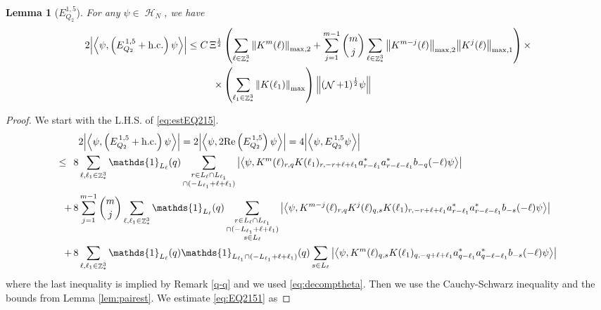 \documentclass[sn-mathphys, Numbered ,a4paper]{sn-jnl}%
\DeclareMathOperator{\Z}{\mathbb{Z}}
\DeclareMathOperator{\HH}{\mathcal{H}}
\DeclareMathOperator{\NN}{\mathcal{N}}
\newcommand{\half}{\frac{1}{2}}
\newcommand{\eva}[1]{\left\langle #1 \right\rangle}
\theoremstyle{plain}
\newtheorem{lemma}[theorem]{Lemma}
\theoremstyle{definition}
\theoremstyle{remark}
\theoremstyle{plain}
\theoremstyle{definition}
\theoremstyle{remark}
\begin{document}
\begin{lemma}[$E_{Q_2}^{1,5}$]
    For any $\psi \in \HH_N$, we have
    \begin{align}
    	2\abs{\eva{\psi,\left(E^{\,1,5}_{Q_2}+\mathrm{h.c.}\right) \psi }}
    	\leq  C\, \Xi^\half &\left(\sum\limits_{\ell \in \Z^3_*} \norm{K^m(\ell)}_{\mathrm{max,2}} +\sum\limits_{j=1}^{m-1} {{m}\choose j} \sum\limits_{\ell \in \Z^3_*} \norm{K^{m-j}(\ell)}_{\mathrm{max,2}}  \norm{ K^{j}(\ell)}_{\mathrm{max},1} \right)\nonumber \times\\ \times&\left( \sum\limits_{\ell_1\in \Z^3_*} \norm{ K(\ell_1)}_{\mathrm{max}} \right) \norm{(\NN+1)^\half \psi}  \label{eq:estEQ215}
    \end{align}
\end{lemma}
\begin{proof}
We start with the L.H.S. of \eqref{eq:estEQ215}.
\begin{align}
    &2\abs{\eva{\psi,\left(E^{\,1,5}_{Q_2}+\mathrm{h.c.}\right) \psi }} = 2\abs{\eva{\psi,2\mathrm{Re}\left(E^{\,1,5}_{Q_2}\right) \psi }} = 4\abs{\eva{\psi, E^{\,1,5}_{Q_2} \psi }}\nonumber\\
    \leq\,\;8& \sum\limits_{\ell, \ell_1\in \Z^3_*} \mathds{1}_{L_{\ell}}(q) \sum\limits_{\substack{r\in L_{\ell} \cap L_{\ell_1} \\ \cap (-L_{\ell_1}+\ell+\ell_1)}} \abs{\eva{\psi,  K^m(\ell)_{r,q} K(\ell_1)_{r,-r+\ell+\ell_1}  a^*_{r-\ell_1}a^*_{r-\ell-\ell_1}b_{-q}(-\ell)\psi }} \label{eq:EQ2151}\\
    +\,8& \sum\limits_{j=1}^{m-1} {{m}\choose j} \sum\limits_{\ell, \ell_1\in \Z^3_*}\mathds{1}_{L_{\ell}}(q) \sum\limits_{\substack{r\in L_{\ell} \cap L_{\ell_1}\\ \cap (-L_{\ell_1}+\ell+\ell_1)\\ s \in L_{\ell}}}  \abs{\eva{\psi, K^{m-j}(\ell)_{r,q} K^j(\ell)_{q,s} K(\ell_1)_{r,-r+\ell+\ell_1}  a^*_{r-\ell_1}a^*_{r-\ell-\ell_1}b_{-s}(-\ell) \psi }} \label{eq:EQ2152}\\
    +\,8&\sum\limits_{\ell, \ell_1\in \Z^3_*} \mathds{1}_{L_{\ell}}(q) \mathds{1}_{L_{\ell_1}\cap (-L_{\ell_1}+\ell+\ell_1)}(q) \sum\limits_{ s \in L_{\ell}} \abs{\eva{\psi, K^m(\ell)_{q,s} K(\ell_1)_{q,-q+\ell+\ell_1}  a^*_{q-\ell_1} a^*_{q-\ell-\ell_1} b_{-s}(-\ell) \psi }} \label{eq:EQ2153}
\end{align}
where the last inequality is implied by Remark \ref{q-q} and we used \eqref{eq:decomptheta}.
Then we use the Cauchy-Schwarz inequality and the bounds from Lemma \ref{lem:pairest}.
We estimate \eqref{eq:EQ2151} as

\end{proof}
\end{document}
